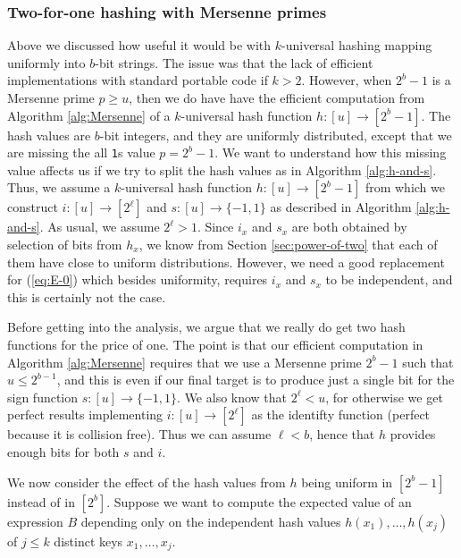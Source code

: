 \documentclass[12pt]{article}
\newcommand{\req}[1]{(\ref{#1})}
\newcommand\fct\rightarrow
\begin{document}
\subsubsection{Two-for-one hashing with  Mersenne primes}\label{sec:two-for-one}
Above we discussed how useful it would be with $k$-universal hashing
mapping uniformly into $b$-bit strings. The issue was that the lack of
efficient implementations with standard portable code if
$k>2$. However, when $2^b-1$ is a Mersenne prime $p\geq u$, then we do
have have the efficient computation from Algorithm \ref{alg:Mersenne}
of a $k$-universal hash function $h:[u]\fct[2^b-1]$. The hash values
are $b$-bit integers, and they are uniformly distributed, except that
we are missing the all \texttt{1}s value $p=2^b-1$. We want to
understand how this missing value affects us if we try to split the
hash values as in Algorithm \ref{alg:h-and-s}. Thus, we assume a
$k$-universal hash function $h:[u]\fct[2^b-1]$ from which we construct
$i:[u]\fct[2^\ell]$ and $s:[u]\fct\{-1,1\}$ as
described in Algorithm \ref{alg:h-and-s}. As usual, we assume $2^\ell>1$.
Since $i_x$ and $s_x$ are
both obtained by selection of bits from $h_x$, we know from Section
\ref{sec:power-of-two} that each of them have close to uniform
distributions. However, we need a good replacement for \req{eq:E-0}
which besides uniformity, requires $i_x$ and $s_x$ to be independent,
and this is certainly not the case.

Before getting into the analysis, we argue that we really do get two
hash functions for the price of one. The point is that our efficient
computation in Algorithm \ref{alg:Mersenne} requires that we use a
Mersenne prime $2^b-1$ such that $u\leq 2^{b-1}$, and this is even if
our final target is to produce just a single bit for the sign function
$s:[u]\fct\{-1,1\}$. We also know that $2^\ell<u$, for otherwise we
get perfect results implementing $i:[u]\fct[2^\ell]$ as the identifty
function (perfect because it is collision free).  Thus we can assume
$\ell<b$, hence that $h$ provides enough bits for both $s$ and $i$.


We now consider the effect of the hash values from $h$ being uniform
in $[2^b-1]$ instead of in $[2^b]$. Suppose we want to compute the
expected value of an expression $B$ depending only on the independent
hash values $h(x_1),\ldots,h(x_j)$ of $j\leq k$ distinct keys
$x_1,\ldots,x_j$.
\end{document}
